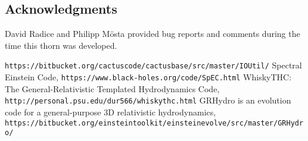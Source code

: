 \subsection{Acknowledgments}
David Radice and Philipp M\"osta provided bug reports and comments during the
time this thorn was developed.

\begin{thebibliography}{9}

\verb+https://bitbucket.org/cactuscode/cactusbase/src/master/IOUtil/+
Spectral Einstein Code,
\verb+https://www.black-holes.org/code/SpEC.html+
WhiskyTHC: The General-Relativistic Templated Hydrodynamics Code,
\verb+http://personal.psu.edu/dur566/whiskythc.html+
GRHydro is an evolution code for a general-purpose 3D relativistic
hydrodynamics,
\verb+https://bitbucket.org/einsteintoolkit/einsteinevolve/src/master/GRHydro/+

\end{thebibliography}



